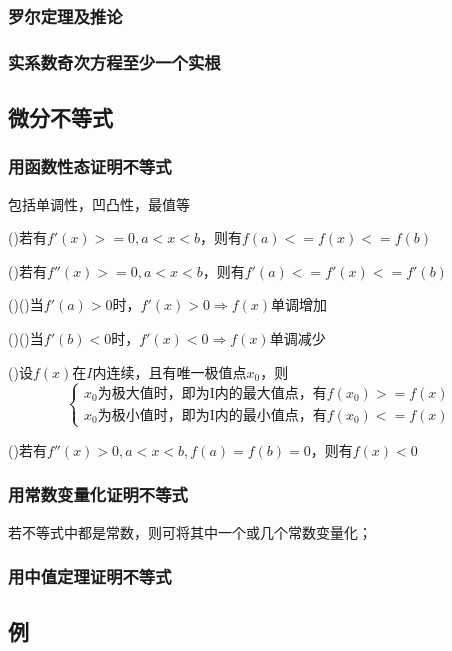 \subsubsection{罗尔定理及推论}

\subsubsection{实系数奇次方程至少一个实根}

\subsection{微分不等式}

\subsubsection{用函数性态证明不等式}
包括单调性，凹凸性，最值等

()若有\(f'(x) >= 0, a < x < b\)，则有\(f(a) <= f(x) <= f(b)\)

()若有\(f''(x) >= 0, a < x < b\)，则有\(f'(a) <= f'(x) <= f'(b)\)

()()当\(f'(a) > 0\)时，\(f'(x) > 0 \Rightarrow f(x)\)单调增加

()()当\(f'(b) < 0\)时，\(f'(x) < 0 \Rightarrow f(x)\)单调减少

()设\(f(x)\)在\(I\)内连续，且有唯一极值点\(x_0\)，则\[\begin{cases}
x_0\text{为极大值时，即为I内的最大值点，有}f(x_0) >= f(x) \\ 
x_0\text{为极小值时，即为I内的最小值点，有}f(x_0) <= f(x)
\end{cases}\]

()若有\(f''(x) > 0, a < x < b, f(a) = f(b) = 0\)，则有\(f(x) < 0\)


\subsubsection{用常数变量化证明不等式}
若不等式中都是常数，则可将其中一个或几个常数变量化；


\subsubsection{用中值定理证明不等式}


\subsection{例}

